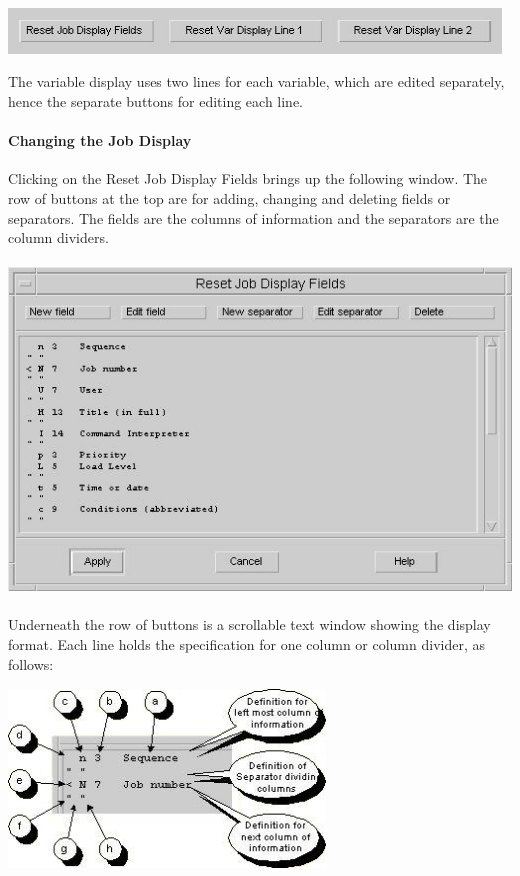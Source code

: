 \includegraphics[width=13.063cm,height=1.214cm]{img/ref31.jpg} 

The variable display uses two lines for each variable, which are edited separately, hence the separate buttons for editing each line.

\paragraph{Changing the Job Display}
Clicking on the Reset Job Display Fields brings up the following window. The row of buttons at the top are for adding, changing and deleting
fields or separators. The fields are the columns of information and the separators are the column dividers.

 \includegraphics[width=13.638cm,height=8.864cm]{img/ref32.jpg} 

Underneath the row of buttons is a scrollable text window showing the display format. Each line holds the specification for one column or
column divider, as follows:

 \includegraphics[width=8.401cm,height=4.785cm]{img/ref33.jpg} 

